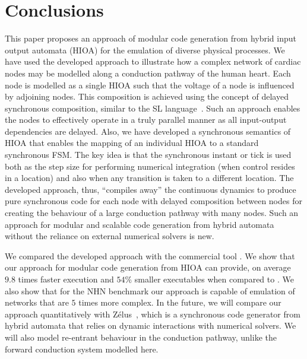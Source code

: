 \section{Conclusions}

This paper proposes an approach of modular code generation from hybrid input output automata (HIOA)
for the emulation of diverse physical processes. We have used the developed approach to illustrate 
how a complex network of cardiac nodes may be modelled along a conduction pathway of the human heart.
Each node is modelled as a single HIOA such that the voltage of a node is influenced by adjoining nodes.
This composition is achieved using the concept of delayed synchronous composition, similar to the SL 
language~\cite{SlLanguage}. Such an approach enables the nodes to effectively operate in a truly parallel manner as all
input-output dependencies are delayed. Also, we have developed a synchronous semantics of HIOA that enables the mapping of 
an individual HIOA to a standard synchronous FSM. The key idea is that the synchronous instant or tick is 
used both as the step size for performing numerical integration (when control resides in a location) and also when 
any transition is taken to a different location. The developed approach, thus, ``compiles away'' the continuous dynamics to
produce pure synchronous code for each node with delayed composition between nodes for creating the behaviour of a large conduction 
pathway with many nodes. Such an approach for modular and scalable code generation from hybrid automata without the reliance on external numerical solvers is new.

We compared the developed approach with the commercial tool \simulink. We show that our approach for modular code generation from \ac{HIOA} can 
provide, on average $9.8$ times faster execution and $54\%$ smaller executables 
when compared to \simulink.
We also show that for the \acf{NHN} benchmark our approach is capable of 
emulation of networks that are $5$ times more complex. 
In the future, we will compare our approach quantitatively with Z\'{e}lus~\cite{bourke13zelus},
 which is a synchronous code generator from hybrid automata that relies on dynamic interactions with numerical solvers.
We will also model re-entrant behaviour in the conduction pathway, unlike the forward conduction 
system modelled here.

